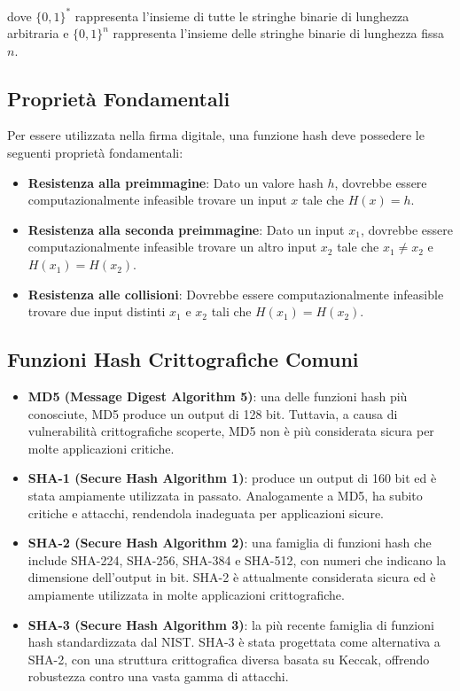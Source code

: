 \documentclass[a4paper,12pt]{report}
\begin{document}
dove $\{0,1\}^*$ rappresenta l'insieme di tutte le stringhe binarie di lunghezza arbitraria e $\{0,1\}^n$ rappresenta l'insieme delle stringhe binarie di lunghezza fissa $n$.

\subsection*{Proprietà Fondamentali}

Per essere utilizzata nella firma digitale, una funzione hash deve possedere le seguenti proprietà fondamentali:

\begin{itemize}
    \item \textbf{Resistenza alla preimmagine}: Dato un valore hash $h$, dovrebbe essere computazionalmente infeasible trovare un input $x$ tale che $H(x) = h$.
    \item \textbf{Resistenza alla seconda preimmagine}: Dato un input $x_1$, dovrebbe essere computazionalmente infeasible trovare un altro input $x_2$ tale che $x_1 \neq x_2$ e $H(x_1) = H(x_2)$.
    \item \textbf{Resistenza alle collisioni}: Dovrebbe essere computazionalmente infeasible trovare due input distinti $x_1$ e $x_2$ tali che $H(x_1) = H(x_2)$.
\end{itemize}

\subsection*{Funzioni Hash Crittografiche Comuni}
\begin{itemize}
    \item \textbf{MD5 (Message Digest Algorithm 5)}: una delle funzioni hash più conosciute, MD5 produce un output di 128 bit. Tuttavia, a causa di vulnerabilità crittografiche scoperte, MD5 non è più considerata sicura per molte applicazioni critiche.
    \item \textbf{SHA-1 (Secure Hash Algorithm 1)}: produce un output di 160 bit ed è stata ampiamente utilizzata in passato. Analogamente a MD5, ha subito critiche e attacchi, rendendola inadeguata per applicazioni sicure.
    \item \textbf{SHA-2 (Secure Hash Algorithm 2)}: una famiglia di funzioni hash che include SHA-224, SHA-256, SHA-384 e SHA-512, con numeri che indicano la dimensione dell'output in bit. SHA-2 è attualmente considerata sicura ed è ampiamente utilizzata in molte applicazioni crittografiche.
    \item \textbf{SHA-3 (Secure Hash Algorithm 3)}: la più recente famiglia di funzioni hash standardizzata dal NIST. SHA-3 è stata progettata come alternativa a SHA-2, con una struttura crittografica diversa basata su Keccak, offrendo robustezza contro una vasta gamma di attacchi.
\end{itemize}
\end{document}

